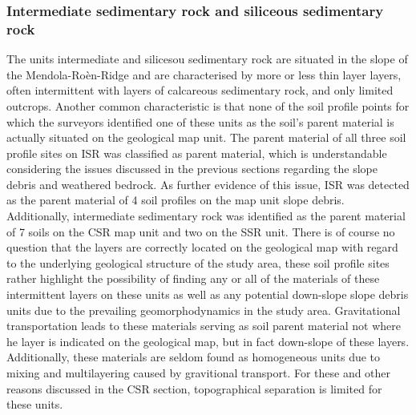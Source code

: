 \documentclass[preprint,12pt,authoryear]{elsarticle}
\begin{document}
\subsubsection{Intermediate sedimentary rock and siliceous sedimentary rock}
The units intermediate and silicesou sedimentary rock are situated in the slope of the Mendola-Ro\`en-Ridge and are characterised by  more or less thin layer layers, often intermittent with layers of calcareous sedimentary rock, and only limited outcrops. Another common characteristic is that none of the soil profile points for which the surveyors identified one of these units as the soil's parent material is actually situated on the geological map unit. The parent material of all three soil profile sites on ISR was classified as parent material, which is understandable considering the issues discussed in the previous sections regarding the slope debris and weathered bedrock. As further evidence of this issue, ISR was detected as the parent material of 4 soil profiles on the map unit slope debris. Additionally, intermediate sedimentary rock was identified as the parent material of 7 soils on the CSR map unit and two on the SSR unit. There is of course no question that the layers are correctly located on the geological map with regard to the underlying geological structure of the study area, these soil profile sites rather highlight the possibility of finding any or all of the materials of these intermittent layers on these units as well as any potential down-slope slope debris units due to the prevailing geomorphodynamics in the study area. Gravitational transportation leads  to these materials serving as soil parent material not where he layer is indicated on the geological map, but in fact down-slope of these layers. Additionally, these materials are seldom found as homogeneous units due to mixing and multilayering caused by gravitional transport. For these and other reasons discussed in the CSR section, topographical separation is limited for these units.
\end{document}

